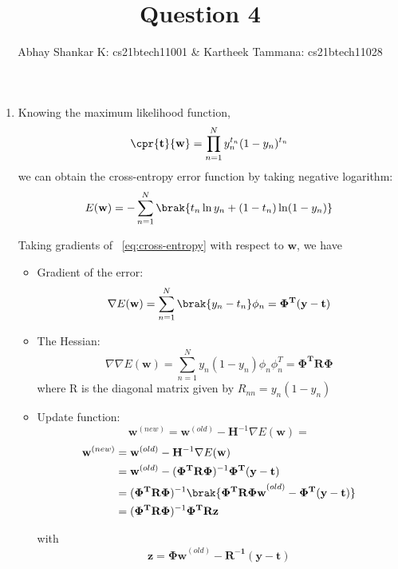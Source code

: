 \documentclass{amsart}
\begin{document}
    \title{Question 4}
    \author{Abhay Shankar K: cs21btech11001 \& Kartheek Tammana: cs21btech11028}
    \maketitle

    \begin{enumerate}[label=\textbf{(\Roman*)}]
        \item 
        Knowing the maximum likelihood function, 
        \[\cpr{\mathbf{t}}{\mathbf{w}} = \prod_{n = 1}^{N} y_n^{t_n} (1 - y_n)^{t_n}\]
         we can obtain the cross-entropy error function by taking negative logarithm: 
        \begin{equation}
            E(\mathbf{w}) = - \sum_{n = 1}^{N} \brak{t_n \ln y_n + (1 - t_n) \ln (1 - y_n)} \label{eq:cross-entropy}
        \end{equation}
        
        Taking gradients of ~\ref{eq:cross-entropy} with respect to \(\mathbf{w}\), we have
        \begin{itemize}
            \item Gradient of the error: \[\nabla E(\mathbf{w}) = \sum_{n = 1}^{N} \brak{y_n - t_n} \phi_n = \mathbf{\Phi^T(y - t)}\]
            \item The Hessian: \[\nabla \nabla E(\mathbf{w}) = \sum_{n = 1}^{N} y_n (1 - y_n) \phi_n \phi_n^T = \mathbf{\Phi^T R \Phi}\] where R is the diagonal matrix given by \(R_{nn} = y_n (1 - y_n)\)
            \item Update function: \[\mathbf{w}^{(new)} = \mathbf{w}^{(old)} - \mathbf{H}^{-1} \nabla E(\mathbf{w}) = \]
            \begin{align}
                \begin{split}
                    \mathbf{w}^{(new)} &= \mathbf{w}^{(old)} - \mathbf{H}^{-1} \nabla E(\mathbf{w}) \\
                            &= \mathbf{w}^{(old)} - (\mathbf{\Phi^T R \Phi})^{-1} \mathbf{\Phi^T(y - t)} \\
                            &= (\mathbf{\Phi^T R \Phi})^{-1} \brak{\mathbf{\Phi^T R \Phi w}^{(old)} - \mathbf{\Phi^T(y - t)}} \\
                            &= (\mathbf{\Phi^T R \Phi})^{-1} \mathbf{\Phi^T R z} \label{eq:update}
                \end{split}
            \end{align}

            with \[\mathbf{z} = \mathbf{\Phi w}^{(old)} - \mathbf{R^{-1} (y - t)}\]
        \end{itemize}


\end{enumerate}
\end{document}

